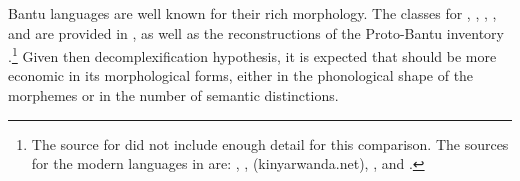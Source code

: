 \documentclass[output=paper,
modfonts
]{langscibook}
\begin{document}
 Bantu languages are well known for their rich  morphology. The  classes for , , , , and  are provided in , as well as the reconstructions of the Proto-Bantu inventory \citep{Meeussen1967,Schadeberg2003derivation}.\footnote{The source for  did not include enough detail for this comparison. The sources for the modern languages in  are:  \citep{Ashton1966},  \citep{Byarushengo1977},  (kinyarwanda.net),  \citep{Kirwan1951}, and  \citep{GuthrieCarrington1988}.} Given then decomplexification hypothesis, it is expected that  should be more economic in its morphological forms, either in the phonological shape of the morphemes or in the number of semantic distinctions.
\end{document}
